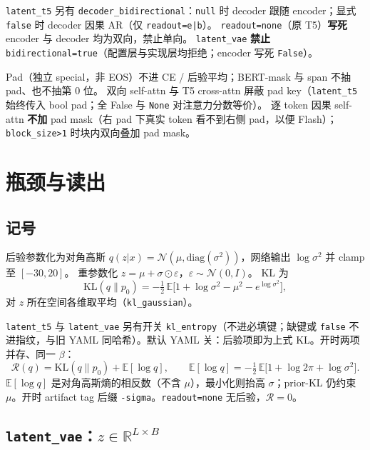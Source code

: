 \documentclass[UTF8,a4paper,11pt]{ctexart}
\begin{document}
\texttt{latent\_t5} 另有 \texttt{decoder\_bidirectional}：\texttt{null} 时 decoder 跟随 encoder；显式 \texttt{false} 时 decoder 因果 AR（仅 \texttt{readout=e|b}）。
\texttt{readout=none}（原 T5）\textbf{写死} encoder 与 decoder 均为双向，禁止单向。
\texttt{latent\_vae} \textbf{禁止} \texttt{bidirectional=true}（配置层与实现层均拒绝；encoder 写死 \texttt{False}）。

Pad（独立 special，非 EOS）不进 CE / 后验平均；BERT-mask 与 span 不抽 pad、也不抽第 0 位。
双向 self-attn 与 T5 cross-attn 屏蔽 pad key（\texttt{latent\_t5} 始终传入 bool pad；全 False 与 \texttt{None} 对注意力分数等价）。
逐 token 因果 self-attn \textbf{不加} pad mask（右 pad 下真实 token 看不到右侧 pad，以便 Flash）；\texttt{block\_size>1} 时块内双向叠加 pad mask。

\section{瓶颈与读出}

\subsection{记号}

后验参数化为对角高斯 $q(z|x)=\mathcal{N}(\mu,\mathrm{diag}(\sigma^2))$，网络输出 $\log\sigma^2$ 并 clamp 至 $[-30,20]$。
重参数化 $z=\mu+\sigma\odot\varepsilon$，$\varepsilon\sim\mathcal{N}(0,I)$。
KL 为
\begin{equation}
  \mathrm{KL}(q\|p_0) = -\tfrac{1}{2}\,\mathbb{E}\bigl[1 + \log\sigma^2 - \mu^2 - e^{\log\sigma^2}\bigr],
\end{equation}
对 $z$ 所在空间各维取平均（\texttt{kl\_gaussian}）。

\texttt{latent\_t5} 与 \texttt{latent\_vae} 另有开关 \texttt{kl\_entropy}（不进必填键；缺键或 \texttt{false} 不进指纹，与旧 YAML 同哈希）。默认 YAML 关：后验项即为上式 KL。开时两项并存、同一 $\beta$：
\begin{equation}
  \mathcal{R}(q)=\mathrm{KL}(q\|p_0)+\mathbb{E}[\log q],\qquad
  \mathbb{E}[\log q] = -\tfrac{1}{2}\,\mathbb{E}\bigl[1 + \log 2\pi + \log\sigma^2\bigr].
\end{equation}
\(\mathbb{E}[\log q]\) 是对角高斯熵的相反数（不含 $\mu$），最小化则抬高 $\sigma$；prior-KL 仍约束 $\mu$。开时 artifact tag 后缀 \texttt{-sigma}。\texttt{readout=none} 无后验，$\mathcal{R}=0$。

\subsection{\texttt{latent\_vae}：$z \in \mathbb{R}^{L \times B}$}
\end{document}
